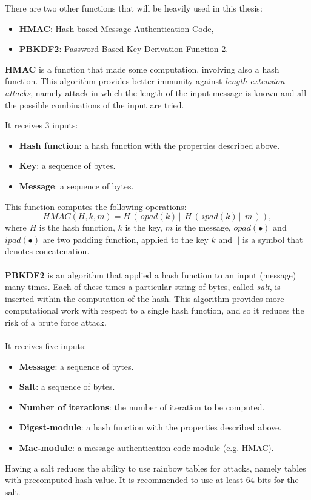 There are two other functions that will be heavily used in this thesis:
\begin{itemize}
	\item \textbf{HMAC}: Hash-based Message Authentication Code,
	\item \textbf{PBKDF2}: Password-Based Key Derivation Function 2.
\end{itemize}
\begin{flushleft}
	\textbf{HMAC} is a function that made some computation, involving also a hash function. This algorithm provides better immunity against \textit{length extension attacks}, namely attack in which the length of the input message is known and all the possible combinations of the input are tried.
\end{flushleft}
It receives 3 inputs:
\begin{itemize}[label=$\odot$]
	\item \textbf{Hash function}: a hash function with the properties described above.
	\item \textbf{Key}: a sequence of bytes.
	\item \textbf{Message}: a sequence of bytes.
\end{itemize}
This function computes the following operations:
\begin{equation*}
HMAC(H,k,m)=H\, (\, opad(k) \, ||\, H\, (\, ipad(k) \, ||\,  m \, )),
\end{equation*}
where $H$ is the hash function, $k$ is the key, $m$ is the message, $opad(\bullet)$ and $ipad(\bullet)$ are two padding function, applied to the key $k$ and $||$ is a symbol that denotes concatenation.
\\ \\
\textbf{PBKDF2} is an algorithm that applied a hash function to an input (message) many times. Each of these times a particular string of bytes, called \textit{salt}, is inserted within the computation of the hash. This algorithm provides more computational work with respect to a single hash function, and so it reduces the risk of a brute force attack.
\\ \\
It receives five inputs:
\begin{itemize}[label=$\odot$]
	\item \textbf{Message}: a sequence of bytes.
	\item \textbf{Salt}: a sequence of bytes.
	\item \textbf{Number of iterations}: the number of iteration to be computed.
	\item \textbf{Digest-module}: a hash function with the properties described above.
	\item \textbf{Mac-module}: a message authentication code  module (e.g. HMAC).
\end{itemize}
Having a salt reduces the ability to use rainbow tables for attacks, namely tables with precomputed hash value. It is recommended to use at least 64 bits for the salt.








